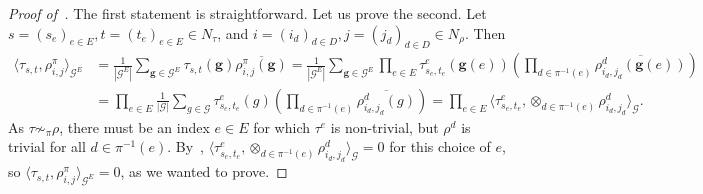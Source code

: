 \documentclass[a4paper,11pt]{article}
\theoremstyle{definition}
\newcommand{\tuple}[1]{{\mathbf{#1}}}
\newcommand{\gr}{\mathscr{G}}
\newcommand{\bg}{\mathbf{g}}
\begin{document}
\begin{proof}[Proof of~]
    The first statement is straightforward. Let us prove the second. Let $s=(s_e)_{e\in E},
    t=(t_e)_{e\in E}
    \in N_\tau$, and $i=(i_d)_{d\in D}, j=(j_d)_{d\in D} \in N_\rho$. Then
    \begin{align*}
    \langle \tau_{s,t}, \rho^\pi_{i,j} \rangle_{\gr^E} & =
    \frac{1}{|\gr^E|}
    \sum_{\tuple{g}\in \gr^E} 
    \tau_{s,t}(\tuple{g}) \overline{\rho^\pi_{i,j}(\tuple{g})}
    =
    \frac{1}{|\gr^E|}
    \sum_{\tuple{g} \in \gr^E}
    \prod_{e\in E}
    \tau_{s_e,t_e}^e(\bg(e))
    \left(\prod_{d\in \pi^{-1}(e)} \overline{\rho_{i_d,j_d}^d(\bg(e))}\right) 
    \\
    & =  \prod_{e\in E}
     \frac{1}{|\gr|}
    \sum_{g \in \gr}
\tau_{s_e,t_e}^e(g)    \left(\prod_{d\in \pi^{-1}(e)} \overline{\rho_{i_d,j_d}^d(g)}\right)  =
    \prod_{e\in E}
    \langle 
    \tau_{s_e,t_e}^e,
        \otimes_{d\in \pi^{-1}(e)} \rho_{i_d,j_d}^d
    \rangle_{\gr}. 
        \end{align*}
    As $\tau \not\sim_\pi \rho$, there must be an index $e\in E$ for which $\tau^e$ is non-trivial, but $\rho^d$ is trivial for all $d\in \pi^{-1}(e)$. By~, $\langle
    \tau_{s_e,t_e}^e, \otimes_{d\in \pi^{-1}(e)} \rho_{i_d,j_d}^d
    \rangle_{\gr}=0$ for this choice of $e$, so 
    $\langle \tau_{s,t}, \rho^\pi_{i,j} \rangle_{\gr^E} =0$, as we wanted to prove. 
\end{proof}


\LEepsilonnoise*
\end{document}
